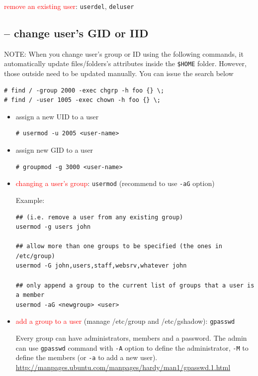 \textcolor{red}{remove an existing user}: \verb!userdel!, \verb!deluser!
  

\subsection{-- change user's GID or IID}

NOTE: When you change user's group or ID using the following commands, it
automatically update files/folders's attributes inside the \verb!$HOME! folder.
However, those outside need to be updated manually. You can issue the search
below
\begin{verbatim}
# find / -group 2000 -exec chgrp -h foo {} \;
# find / -user 1005 -exec chown -h foo {} \;
\end{verbatim}

\begin{itemize}
  
  \item assign a new UID to a user
  
\begin{verbatim}
# usermod -u 2005 <user-name>
\end{verbatim}

  \item assign new GID to a user
  
\begin{verbatim}
# groupmod -g 3000 <user-name>
\end{verbatim}

  \item \textcolor{red}{changing a user's group}:
  \verb!usermod! (recommend to use \verb!-aG! option)

Example:
\begin{verbatim}
## (i.e. remove a user from any existing group)
usermod -g users john

## allow more than one groups to be specified (the ones in /etc/group) 
usermod -G john,users,staff,websrv,whatever john

## only append a group to the current list of groups that a user is a member
usermod -aG <newgroup> <user>
\end{verbatim} 

  \item \textcolor{red}{add a group to a user} (manage /etc/group and
  /etc/gshadow):   \verb!gpasswd!
  
  Every group can have administrators, members and a password. The admin can
  use \verb!gpasswd! command with \verb!-A! option to define the
  administrator, \verb!-M! to define the members (or \verb!-a! to add a new
  user). \url{http://manpages.ubuntu.com/manpages/hardy/man1/gpasswd.1.html}
    

\end{itemize}
